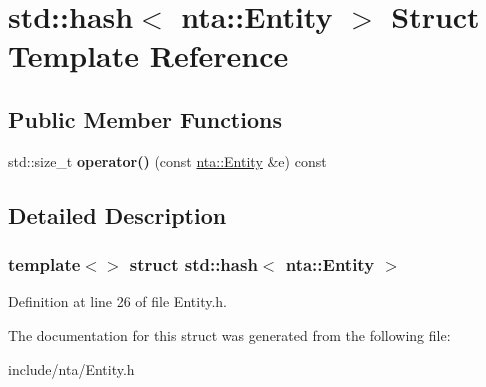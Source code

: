\hypertarget{structstd_1_1hash_3_01nta_1_1Entity_01_4}{}\section{std\+:\+:hash$<$ nta\+:\+:Entity $>$ Struct Template Reference}
\label{structstd_1_1hash_3_01nta_1_1Entity_01_4}
\subsection*{Public Member Functions}
\begin{DoxyCompactItemize}
\item 
\mbox{\label{structstd_1_1hash_3_01nta_1_1Entity_01_4_a0db14df5d7ed3ebab2d6788c3430efec}} 
std\+::size\+\_\+t {\bfseries operator()} (const \hyperlink{classnta_1_1Entity}{nta\+::\+Entity} \&e) const
\end{DoxyCompactItemize}


\subsection{Detailed Description}
\subsubsection*{template$<$$>$\newline
struct std\+::hash$<$ nta\+::\+Entity $>$}



Definition at line 26 of file Entity.\+h.



The documentation for this struct was generated from the following file\+:\begin{DoxyCompactItemize}
\item 
include/nta/Entity.\+h\end{DoxyCompactItemize}

